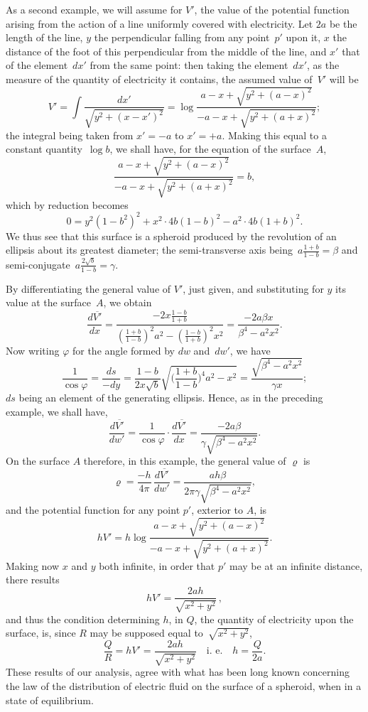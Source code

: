 \documentclass[12pt,notitlepage]{amsart}
\renewcommand{\rho}{\varrho}
\renewcommand{\phi}{\varphi}
\begin{document}
As a second example, we will assume for $V'$, the value of the potential
function arising from the action of a line uniformly covered with electricity.
Let $2a$ be the length of the line, $y$ the perpendicular falling from any
point~$p'$ upon it, $x$ the distance of the foot of this perpendicular from the
middle of the line, and $x'$ that of the element~$dx'$ from the same point: then
taking the element~$dx'$, as the measure of the quantity of electricity it 
contains, the assumed value of~$V'$ will be
\[
V'=\int\frac{dx'}{\sqrt{y^2+(x-x')^2}}
=\log\frac{a-x+\sqrt{y^2+(a-x)^2}}{-a-x+\sqrt{y^2+(a+x)^2}};
\]
the integral being taken from $x'=-a$ to $x'=+a$. Making this equal to
a constant quantity~$\log b$, we shall have,
for the equation of the surface~$A$,
\[
\frac{a-x+\sqrt{y^2+(a-x)^2}}{-a-x+\sqrt{y^2+(a+x)^2}}=b,
\]
which by reduction becomes
\[
0=y^2(1-b^2)^2+x^2\cdot 4b(1-b)^2-a^2\cdot 4b(1+b)^2.
\]
We thus see that this surface is a spheroid produced by the revolution of an
ellipsis about its greatest diameter;
the semi-transverse axis being~${a\frac{1+b}{1-b}=\beta}$
and semi-conjugate~${a\frac{2\sqrt b}{1-b}=\gamma}$.

By differentiating the general value of $V'$, just given, and substituting
for $y$ its value at the surface~$A$, we obtain
\[
\frac{d\overline{V'}}{dx}
=\frac{-2x\frac{1-b}{1+b}}{(\frac{1+b}{1-b})^2a^2-(\frac{1-b}{1+b})^2x^2}
=\frac{-2a\beta x}{\beta^4-a^2x^2}.
\]
Now writing $\phi$ for the angle formed by $dw$ and~$dw'$, we have
\[
\frac{1}{\cos\phi}=\frac{ds}{-dy}
=\frac{1-b}{2x\sqrt b}\sqrt{\biggl(\frac{1+b}{1-b}\biggr)^4a^2-x^2}
=\frac{\sqrt{\beta^4-a^2x^2}}{\gamma x};
\]
$ds$ being an element of the generating ellipsis. Hence, as in the preceding
example, we shall have,
\[
\frac{d\overline{V'}}{dw'}=\frac{1}{\cos\phi}\cdot\frac{d\overline{V'}}{dx}
=\frac{-2a\beta}{\gamma\sqrt{\beta^4-a^2x^2}}.
\]
On the surface $A$ therefore, in this example, the general value of $\rho$ is
\[
\rho=\frac{-h}{4\pi}\,\frac{d\overline{V'}}{dw'}
=\frac{ah\beta}{2\pi\gamma\sqrt{\beta^4-a^2x^2}},
\]
and the potential function for any point $p'$, exterior to $A$, is
\[
hV'=h\log\frac{a-x+\sqrt{y^2+(a-x)^2}}{-a-x+\sqrt{y^2+(a+x)^2}}.
\]
Making now $x$ and $y$ both infinite, in order that $p'$ may be at an infinite
distance, there results
\[
hV'=\frac{2ah}{\sqrt{x^2+y^2}}\,,
\]
and thus the condition determining $h$, in $Q$, the quantity of electricity upon
the surface, is, since $R$ may be supposed equal to~$\sqrt{x^2+y^2}$,
\[
\frac QR=hV'=\frac{2ah}{\sqrt{x^2+y^2}}
\quad\text{i.~e.}\quad
h=\frac{Q}{2a}.
\]
These results of our analysis, agree with what has been long known concerning
the law of the distribution of electric fluid on the surface of a spheroid,
when in a state of equilibrium.
\bigskip
\end{document}

